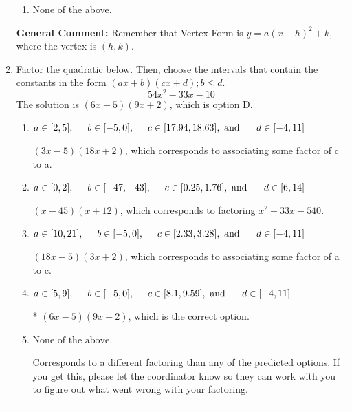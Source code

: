 \documentclass{extbook}[14pt]
\newcommand{\litem}[1]{\item #1

\rule{\textwidth}{0.4pt}}
\begin{document}
\begin{enumerate}
{\begin{enumerate}[label=\Alph*.]
\begin{multicols}{2}
\end{multicols}\item None of the above.\end{enumerate}
\textbf{General Comment:} Remember that Vertex Form is $y = a(x-h)^2+k$, where the vertex is $(h, k)$.
}
\litem{
Factor the quadratic below. Then, choose the intervals that contain the constants in the form $(ax+b)(cx+d); b \leq d.$
\[ 54x^{2} -33 x -10 \]The solution is \( (6x -5)(9x + 2) \), which is option D.\begin{enumerate}[label=\Alph*.]
\item \( a \in [2, 5], \hspace*{5mm} b \in [-5, 0], \hspace*{5mm} c \in [17.94, 18.63], \text{ and } \hspace*{5mm} d \in [-4, 11] \)

 $(3x -5)(18x + 2)$, which corresponds to associating some factor of c to a.
\item \( a \in [0, 2], \hspace*{5mm} b \in [-47, -43], \hspace*{5mm} c \in [0.25, 1.76], \text{ and } \hspace*{5mm} d \in [6, 14] \)

 $(x -45)(x + 12)$, which corresponds to factoring $x^{2} -33 x -540$.
\item \( a \in [10, 21], \hspace*{5mm} b \in [-5, 0], \hspace*{5mm} c \in [2.33, 3.28], \text{ and } \hspace*{5mm} d \in [-4, 11] \)

 $(18x -5)(3x + 2)$, which corresponds to associating some factor of a to c.
\item \( a \in [5, 9], \hspace*{5mm} b \in [-5, 0], \hspace*{5mm} c \in [8.1, 9.59], \text{ and } \hspace*{5mm} d \in [-4, 11] \)

* $(6x -5)(9x + 2)$, which is the correct option.
\item \( \text{None of the above.} \)

 Corresponds to a different factoring than any of the predicted options. If you get this, please let the coordinator know so they can work with you to figure out what went wrong with your factoring.
\end{enumerate}

}
\end{enumerate}
\end{document}

